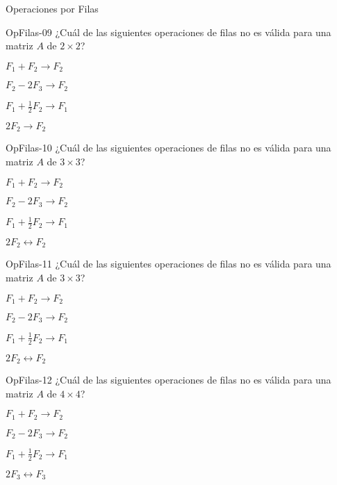 \documentclass[a4,11pt]{aleph-notas}
\begin{document}
\begin{quiz}{Operaciones por Filas}
\begin{multi}[]%
    {OpFilas-09}
    ¿Cuál de las siguientes operaciones de filas no es válida para una matriz $A$ de $2\times 2$?
    \item $F_1+F_2\to F_2$
    \item* $F_2-2F_3\to F_2$
    \item $F_1+\frac{1}{2}F_2\to F_1$
    \item $2F_2\to F_2$
\end{multi}

\begin{multi}[]%
    {OpFilas-10}
    ¿Cuál de las siguientes operaciones de filas no es válida para una matriz $A$ de $3\times 3$?
    \item $F_1+F_2\to F_2$
    \item $F_2-2F_3\to F_2$
    \item $F_1+\frac{1}{2}F_2\to F_1$
    \item* $2F_2\leftrightarrow F_2$
\end{multi}

\begin{multi}[]%
    {OpFilas-11}
    ¿Cuál de las siguientes operaciones de filas no es válida para una matriz $A$ de $3\times 3$?
    \item $F_1+F_2\to F_2$
    \item $F_2-2F_3\to F_2$
    \item $F_1+\frac{1}{2}F_2\to F_1$
    \item* $2F_2\leftrightarrow F_2$
\end{multi}

\begin{multi}[]%
    {OpFilas-12}
    ¿Cuál de las siguientes operaciones de filas no es válida para una matriz $A$ de $4\times 4$?
    \item $F_1+F_2\to F_2$
    \item $F_2-2F_3\to F_2$
    \item $F_1+\frac{1}{2}F_2\to F_1$
    \item* $2F_3\leftrightarrow F_3$
\end{multi}

\end{quiz}
\end{document}
